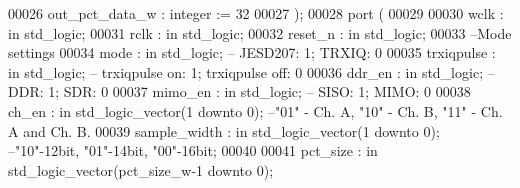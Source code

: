 \begin{DoxyCode}
00026       \textcolor{vhdlchar}{out_pct_data_w}    \textcolor{vhdlchar}{:} \textcolor{comment}{integer} \textcolor{vhdlchar}{:=} \textcolor{vhdllogic}{}\textcolor{vhdllogic}{32}
00027    \textcolor{vhdlchar}{)};
00028    \textcolor{keywordflow}{port} \textcolor{vhdlchar}{(}
00029 
00030       \textcolor{vhdlchar}{wclk}              \textcolor{vhdlchar}{:} \textcolor{keywordflow}{in} \textcolor{comment}{std\_logic};
00031       \textcolor{vhdlchar}{rclk}              \textcolor{vhdlchar}{:} \textcolor{keywordflow}{in} \textcolor{comment}{std\_logic};
00032       \textcolor{vhdlchar}{reset_n}           \textcolor{vhdlchar}{:} \textcolor{keywordflow}{in} \textcolor{comment}{std\_logic};
00033 \textcolor{keyword}{      --Mode settings}
00034       \textcolor{vhdlchar}{mode}                \textcolor{vhdlchar}{:} \textcolor{keywordflow}{in} \textcolor{comment}{std\_logic};\textcolor{keyword}{ -- JESD207: 1; TRXIQ: 0}
00035       \textcolor{vhdlchar}{trxiqpulse}          \textcolor{vhdlchar}{:} \textcolor{keywordflow}{in} \textcolor{comment}{std\_logic};\textcolor{keyword}{ -- trxiqpulse on: 1; trxiqpulse off: 0}
00036         \textcolor{vhdlchar}{ddr_en}            \textcolor{vhdlchar}{:} \textcolor{keywordflow}{in} \textcolor{comment}{std\_logic};\textcolor{keyword}{ -- DDR: 1; SDR: 0}
00037         \textcolor{vhdlchar}{mimo_en}           \textcolor{vhdlchar}{:} \textcolor{keywordflow}{in} \textcolor{comment}{std\_logic};\textcolor{keyword}{ -- SISO: 1; MIMO: 0}
00038         \textcolor{vhdlchar}{ch_en}                 \textcolor{vhdlchar}{:} \textcolor{keywordflow}{in} \textcolor{comment}{std\_logic\_vector}\textcolor{vhdlchar}{(}\textcolor{vhdllogic}{}\textcolor{vhdllogic}{1} \textcolor{keywordflow}{downto} \textcolor{vhdllogic}{}\textcolor{vhdllogic}{0}\textcolor{vhdlchar}{)};\textcolor{keyword}{ --"01" - Ch. A, "10" - Ch. B, "11" - Ch. A
       and Ch. B.  }
00039       \textcolor{vhdlchar}{sample_width}      \textcolor{vhdlchar}{:} \textcolor{keywordflow}{in} \textcolor{comment}{std\_logic\_vector}\textcolor{vhdlchar}{(}\textcolor{vhdllogic}{}\textcolor{vhdllogic}{1} \textcolor{keywordflow}{downto} \textcolor{vhdllogic}{}\textcolor{vhdllogic}{0}\textcolor{vhdlchar}{)};\textcolor{keyword}{ --"10"-12bit, "01"-14bit, "00"-16bit;}
00040       
00041       \textcolor{vhdlchar}{pct_size}          \textcolor{vhdlchar}{:} \textcolor{keywordflow}{in} \textcolor{comment}{std\_logic\_vector}\textcolor{vhdlchar}{(}\textcolor{vhdlchar}{pct_size_w}\textcolor{vhdlchar}{-}\textcolor{vhdllogic}{}\textcolor{vhdllogic}{1} \textcolor{keywordflow}{downto} \textcolor{vhdllogic}{}\textcolor{vhdllogic}{0}\textcolor{vhdlchar}{)}; 

\end{DoxyCode}
